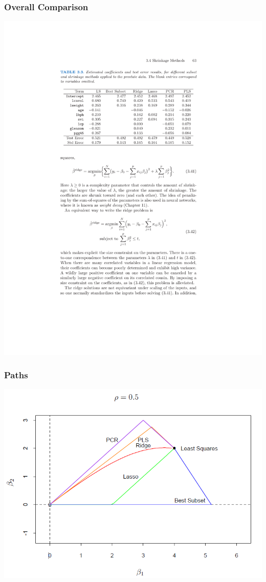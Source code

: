 \begin{frame}
    \frametitle{Overall Comparison}
    \begin{center}
    \includegraphics[height=0.85\textheight]{./resources/regressiontable}
    \end{center}
\end{frame}
    
\begin{frame}
    \frametitle{Paths}
    \begin{center}
    \includegraphics[height=0.85\textheight]{./resources/ESLshrinkpathPositive}
    \end{center}
\end{frame}

